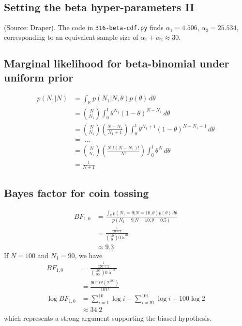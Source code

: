 \documentclass{article}
\begin{document}
\subsection{Setting the beta hyper-parameters II}
(Source: Draper). The code in \texttt{316-beta-cdf.py} finds $\alpha_1 = 4.506$, $\alpha_2 = 25.534$, corresponding to an equivalent sample size of $\alpha_1+\alpha_2 \approx 30$.

\subsection{Marginal likelihood for beta-binomial under uniform prior}
\begin{align*}
p(N_1|N) &= \int_{\mathbb{R}} p(N_1|N,\theta)p(\theta) \,d\theta\\
&= {N \choose N_1} \int_0^1 \theta^{N_1} (1-\theta)^{N-N_1} \,d\theta\\
&= {N \choose N_1} \left(\frac{N-N_1}{N_1+1}\right) \int_0^1 \theta^{N_1+1} (1-\theta)^{N-N_1-1} \,d\theta\\
&= \,\,\dots\\
&= {N \choose N_1} \left(\frac{N_1!(N-N_1)!}{N!}\right) \int_0^1 \theta^N \,d\theta\\
&= \frac{1}{N+1}
\end{align*}

\subsection{Bayes factor for coin tossing}
\begin{align*}
BF_{1,0} &= \frac{\int_{\mathbb{R}} p(N_1=9|N=10,\theta)p(\theta) \,d\theta}{p(N_1=9|N=10,\theta=0.5)}\\
&= \frac{\frac{1}{10+1}}{{10 \choose 9} 0.5^{10}}\\
&\approx 9.3
\end{align*}
If $N=100$ and $N_1=90$, we have
\begin{align*}
BF_{1,0} &= \frac{\frac{1}{100+1}}{{100 \choose 90} 0.5^{100}}\\
&= \frac{90!10!(2^{100})}{101!}\\
\log BF_{1,0} &= \sum_{i=1}^{10} \log i - \sum_{i=91}^{101} \log i + 100\log 2\\
&\approx 34.2
\end{align*}
which represents a strong argument supporting the biased hypothesis.
\end{document}
